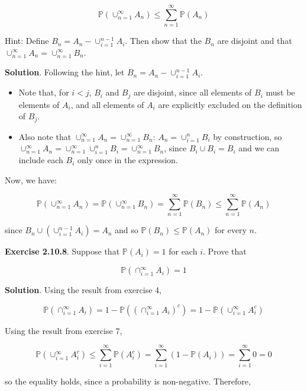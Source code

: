 \[ \mathbb{P}\left( \cup_{n=1}^\infty A_n \right) \leq \sum_{n=1}^\infty \mathbb{P}(A_n) \]

Hint: Define \(B_n = A_n - \cup_{i=1}^{n-1} A_i\). Then show that the
\(B_n\) are disjoint and that
\(\cup_{n=1}^\infty A_n  =\cup_{n=1}^\infty B_n\).

\textbf{Solution}. Following the hint, let
\(B_n = A_n - \cup_{i=1}^{n-1} A_i\).

\begin{itemize}[tightlist]
\item
  Note that, for \(i < j\), \(B_i\) and \(B_j\) are disjoint, since all
  elements of \(B_i\) must be elements of \(A_i\), and all elements of
  \(A_i\) are explicitly excluded on the definition of \(B_j\).
\item
  Also note that \(\cup_{n=1}^\infty A_n = \cup_{n=1}^\infty B_n\):
  \(A_n = \cup_{i=1}^n B_i\) by construction, so
  \(\cup_{n=1}^\infty A_n = \cup_{n=1}^\infty \cup_{i=1}^n B_i = \cup_{n=1}^\infty B_n\),
  since \(B_i \cup B_i = B_i\) and we can include each \(B_i\) only once
  in the expression.
\end{itemize}

Now, we have:

\[ \mathbb{P}\left( \cup_{n=1}^\infty A_n \right) = \mathbb{P}\left( \cup_{n=1}^\infty B_n \right) = \sum_{n=1}^\infty \mathbb{P}(B_n) \leq \sum_{n=1}^\infty \mathbb{P}(A_n) \]

since \(B_n \cup \left(\cup_{i=1}^{n-1} A_i\right) = A_n\) and so
\(\mathbb{P}(B_n) \leq \mathbb{P}(A_n)\) for every \(n\).

\textbf{Exercise 2.10.8}. Suppose that \(\mathbb{P}(A_i) = 1\) for each
\(i\). Prove that

\[ \mathbb{P}\left( \cap_{i=1}^\infty A_i \right) = 1 \]

\textbf{Solution}. Using the result from exercise 4,

\[ \mathbb{P}\left( \cap_{i=1}^\infty A_i \right) = 1 - \mathbb{P}\left(\left( \cap_{i=1}^\infty A_i \right)^c\right)
= 1 - \mathbb{P}\left( \cup_{i=1}^\infty A_i^c \right)\]

Using the result from exercise 7,

\[ \mathbb{P}\left( \cup_{i=1}^\infty A_i^c \right) \leq \sum_{i=1}^\infty \mathbb{P}(A_i^c) =  \sum_{i=1}^\infty \left(1 - \mathbb{P}\left( A_i \right) \right) = \sum_{i=1}^\infty 0 = 0 \]

so the equality holds, since a probability is non-negative. Therefore,

